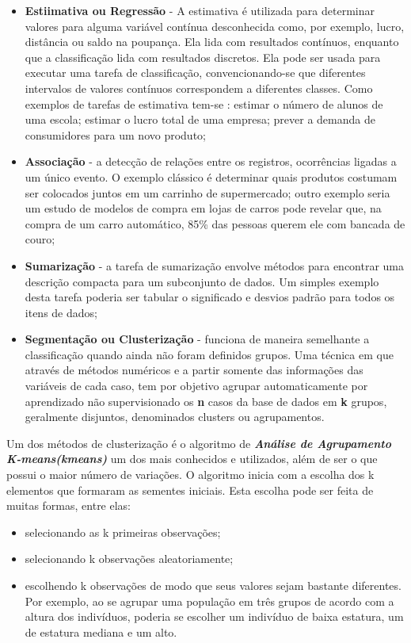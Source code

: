 \documentclass[a4paper, 12pt]{article}
\begin{document}
\begin{multicols}{2}
\begin{itemize}
			\item \textbf{Estiimativa ou Regressão} - A estimativa é utilizada para determinar  valores para alguma variável contínua desconhecida como, por exemplo, lucro, distância ou saldo na poupança. Ela lida com resultados contínuos, enquanto que a classificação lida com resultados discretos. Ela pode ser usada para executar uma tarefa de classificação, convencionando-se que diferentes intervalos de valores contínuos correspondem a diferentes classes. Como exemplos de tarefas de estimativa tem-se : estimar o número de alunos de uma escola; estimar o lucro  total de uma empresa;  prever a demanda de consumidores para um novo produto;
			
			\item \textbf{Associação} - a detecção de relações entre os registros, ocorrências ligadas a um único evento. O exemplo clássico é determinar quais produtos costumam ser colocados juntos em um carrinho de supermercado; outro exemplo seria um estudo de modelos de compra em lojas de carros pode revelar que, na compra de um carro automático, 85\% das pessoas querem ele com bancada de couro;
			
			\item \textbf{Sumarização} - a tarefa de sumarização envolve métodos para encontrar uma descrição compacta para um subconjunto de dados. Um simples exemplo desta tarefa poderia ser tabular o significado e desvios padrão para todos os itens de dados;
			
			\item \textbf{Segmentação ou Clusterização} - funciona de maneira semelhante a classificação quando ainda não foram definidos grupos. Uma técnica em que através de métodos numéricos e a partir somente das informações das variáveis de cada caso, tem por objetivo agrupar automaticamente por aprendizado não supervisionado os \textbf{n} casos da base de dados em \textbf{k} grupos, geralmente disjuntos, denominados clusters ou agrupamentos.			
		\end{itemize}
	
		Um dos métodos de clusterização é o algoritmo de \textit{\textbf{Análise de Agrupamento K-means(kmeans)}}  um dos mais conhecidos e utilizados, além de ser o que possui o maior número de variações. O algoritmo inicia com a escolha dos  k elementos que formaram as sementes iniciais. Esta escolha pode ser feita de muitas formas, entre elas:
		\begin{itemize}
			\item selecionando as k primeiras observações;
			\item selecionando k observações aleatoriamente; 
			\item escolhendo k observações de modo que seus valores sejam bastante diferentes. Por exemplo, ao se agrupar uma população em três grupos de acordo com a altura dos indivíduos, poderia se escolher um indivíduo de baixa estatura, um de estatura mediana e um alto.			
		\end{itemize}
	

\end{multicols}
\end{document}
